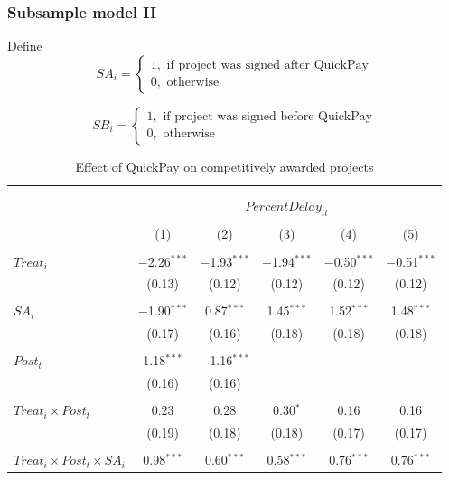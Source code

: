 \documentclass[
]{article}
\begin{document}
\hypertarget{subsample-model-ii}{%
\subsubsection{Subsample model II}\label{subsample-model-ii}}

Define
\[ SA_i = \begin{cases} 1, \text{ if project was signed after QuickPay}\\
0, \text{ otherwise} \end{cases}\]

\[ SB_i = \begin{cases} 1, \text{ if project was signed before QuickPay}\\
0, \text{ otherwise} \end{cases}\]

\begin{table}[H] \centering 
  \caption{Effect of QuickPay on competitively awarded projects} 
  \label{} 
\small 
\begin{tabular}{@{\extracolsep{-2pt}}lccccc} 
\\[-1.8ex]\hline 
\hline \\[-1.8ex] 
\\[-1.8ex] & \multicolumn{5}{c}{$PercentDelay_{it}$  } \\ 
\\[-1.8ex] & (1) & (2) & (3) & (4) & (5)\\ 
\hline \\[-1.8ex] 
 $Treat_i$ & $-$2.26$^{***}$ & $-$1.93$^{***}$ & $-$1.94$^{***}$ & $-$0.50$^{***}$ & $-$0.51$^{***}$ \\ 
  & (0.13) & (0.12) & (0.12) & (0.12) & (0.12) \\ 
  & & & & & \\ 
 $SA_i$ & $-$1.90$^{***}$ & 0.87$^{***}$ & 1.45$^{***}$ & 1.52$^{***}$ & 1.48$^{***}$ \\ 
  & (0.17) & (0.16) & (0.18) & (0.18) & (0.18) \\ 
  & & & & & \\ 
 $Post_t$ & 1.18$^{***}$ & $-$1.16$^{***}$ &  &  &  \\ 
  & (0.16) & (0.16) &  &  &  \\ 
  & & & & & \\ 
 $Treat_i \times Post_t$ & 0.23 & 0.28 & 0.30$^{*}$ & 0.16 & 0.16 \\ 
  & (0.19) & (0.18) & (0.18) & (0.17) & (0.17) \\ 
  & & & & & \\ 
 $Treat_i \times Post_t \times SA_i $ & 0.98$^{***}$ & 0.60$^{***}$ & 0.58$^{***}$ & 0.76$^{***}$ & 0.76$^{***}$ \\ 

\end{tabular}
\end{table}
\end{document}
